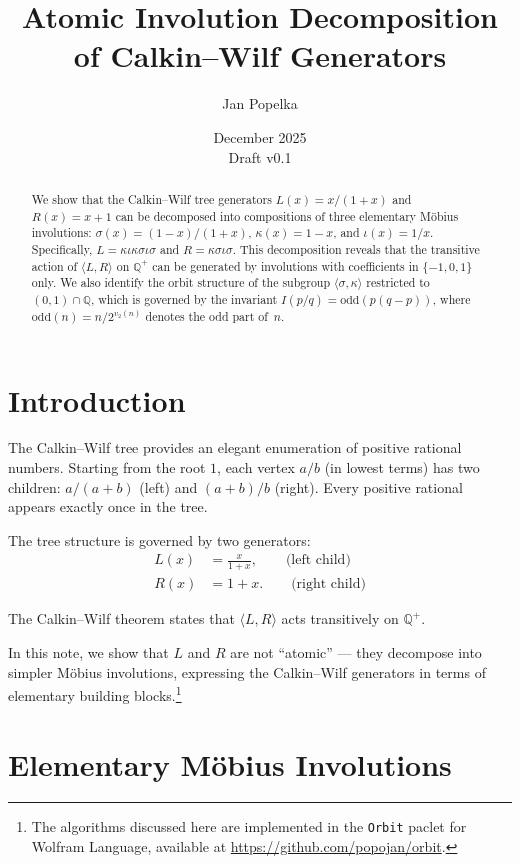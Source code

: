 \documentclass[11pt]{article}
\title{Atomic Involution Decomposition of Calkin--Wilf Generators}
\author{Jan Popelka}
\date{December 2025 \\ \small Draft v0.1}
\theoremstyle{plain}
\theoremstyle{definition}
\theoremstyle{remark}
\begin{document}
\maketitle

\begin{abstract}
We show that the Calkin--Wilf tree generators $L(x) = x/(1+x)$ and $R(x) = x+1$
can be decomposed into compositions of three elementary M\"obius involutions:
$\sigma(x) = (1-x)/(1+x)$, $\kappa(x) = 1-x$, and $\iota(x) = 1/x$.
Specifically, $L = \kappa\iota\kappa\sigma\iota\sigma$ and $R = \kappa\sigma\iota\sigma$.
This decomposition reveals that the transitive action of $\langle L, R \rangle$ on $\mathbb{Q}^+$
can be generated by involutions with coefficients in $\{-1, 0, 1\}$ only.
We also identify the orbit structure of the subgroup $\langle \sigma, \kappa \rangle$
restricted to $(0,1) \cap \mathbb{Q}$, which is governed by the invariant
$I(p/q) = \mathrm{odd}(p(q-p))$, where $\mathrm{odd}(n) = n/2^{v_2(n)}$ denotes the odd part of~$n$.
\end{abstract}

\section{Introduction}

The Calkin--Wilf tree \cite{CalkinWilf2000} provides an elegant enumeration of positive
rational numbers. Starting from the root $1$, each vertex $a/b$ (in lowest terms) has
two children: $a/(a+b)$ (left) and $(a+b)/b$ (right). Every positive rational appears
exactly once in the tree.

The tree structure is governed by two generators:
\begin{align}
L(x) &= \frac{x}{1+x}, \qquad \text{(left child)} \\
R(x) &= 1 + x. \qquad \text{(right child)}
\end{align}

The Calkin--Wilf theorem states that $\langle L, R \rangle$ acts transitively on $\mathbb{Q}^+$.

In this note, we show that $L$ and $R$ are not ``atomic'' --- they decompose into
simpler M\"obius involutions, expressing the Calkin--Wilf generators in terms of
elementary building blocks.\footnote{The algorithms discussed here are implemented
in the \texttt{Orbit} paclet for Wolfram Language, available at
\url{https://github.com/popojan/orbit}.}

\section{Elementary M\"obius Involutions}
\end{document}
